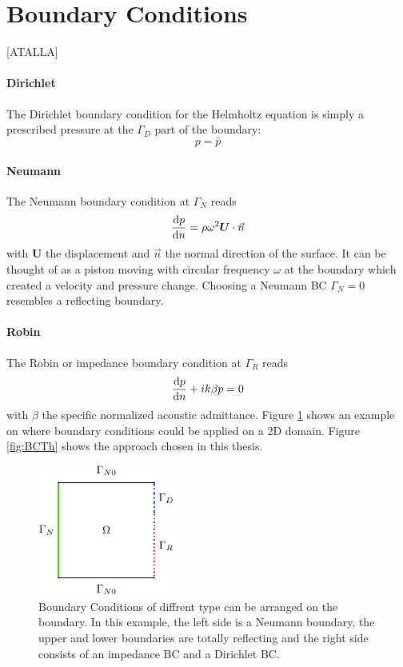 \documentclass[%
  a4paper,oneside,%
  11pt,%
  smallchapters,
  green,%
  rgb, <cmyk>
  ,]{tubsbook}
\begin{document}
\section{Boundary Conditions}
[ATALLA]
\paragraph{Dirichlet}
The Dirichlet boundary condition for the Helmholtz equation is simply a prescribed pressure at the $\Gamma_D$ part of the boundary:
\begin{equation}
p = \bar{p}
\end{equation}


\paragraph{Neumann}
The Neumann boundary condition at $\Gamma_N$ reads
\begin{equation}
\dv{p}{n} = \rho \omega^2 \bm{U} \cdot \vec{n}
\end{equation}
with $\bm{U}$ the displacement and $\vec{n}$ the normal direction of the surface. It can be thought of as a piston moving with circular frequency $\omega$ at the boundary which created a velocity and pressure change. Choosing a Neumann BC $\Gamma_N = 0$ resembles a reflecting boundary.

\paragraph{Robin}
The Robin or impedance boundary condition at $\Gamma_R$ reads
\begin{equation}
\dv{p}{n} + ik \beta p = 0
\end{equation}
with $\beta$ the specific normalized acoustic admittance.
Figure \ref{fig:BCEx} shows an example on where boundary conditions could be applied on a 2D domain. Figure \ref{fig:BCTh} shows the approach chosen in this thesis.


\begin{figure}[h]
\begin{center}
\includegraphics[width=0.4\textwidth]{pics/BCsExample}
\caption{Boundary Conditions of diffrent type can be arranged on the boundary. In this example, the left side is a Neumann boundary, the upper and lower boundaries are totally reflecting and the right side consists of an impedance BC and a Dirichlet BC.}
\label{fig:BCEx}
\end{center}
\end{figure}
\end{document}
